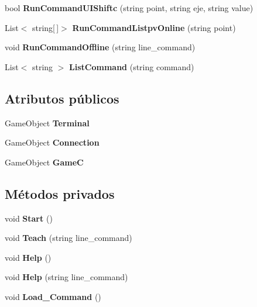\begin{DoxyCompactItemize}
bool {\bfseries Run\+Command\+U\+I\+Shiftc} (string point, string eje, string value)
\item 
\mbox{\label{class_controller_a65282850ef11298e5acd69b9ac61cdca}} 
List$<$ string\mbox{[}$\,$\mbox{]}$>$ {\bfseries Run\+Command\+Listpv\+Online} (string point)
\item 
\mbox{\label{class_controller_aa579bf7f25f6004e8e0e25a2dd044315}} 
void {\bfseries Run\+Command\+Offline} (string line\+\_\+command)
\item 
\mbox{\label{class_controller_ab898360be80b484fa530ed9551b37897}} 
List$<$ string $>$ {\bfseries List\+Command} (string command)
\end{DoxyCompactItemize}
\subsection*{Atributos públicos}
\begin{DoxyCompactItemize}
\item 
\mbox{\label{class_controller_a51323d3c4ec14f6cb08c5ff78f043294}} 
Game\+Object {\bfseries Terminal}
\item 
\mbox{\label{class_controller_af40ddeff071064e6f098552df3cfd34e}} 
Game\+Object {\bfseries Connection}
\item 
\mbox{\label{class_controller_a1eb5e590212ea6268156999f313bf76c}} 
Game\+Object {\bfseries GameC}
\end{DoxyCompactItemize}
\subsection*{Métodos privados}
\begin{DoxyCompactItemize}
\item 
\mbox{\label{class_controller_afb3af298c368aea3203c2c0401f92eb5}} 
void {\bfseries Start} ()
\item 
\mbox{\label{class_controller_a5451887045a5b5daedd6fb1d0c9c90ae}} 
void {\bfseries Teach} (string line\+\_\+command)
\item 
\mbox{\label{class_controller_aec3ce5bf2c2fa1e9a3aba0b9c2475770}} 
void {\bfseries Help} ()
\item 
\mbox{\label{class_controller_ab6a32e48c4abe328f741916fbeccb0c5}} 
void {\bfseries Help} (string line\+\_\+command)
\item 
\mbox{\label{class_controller_abafc0ba1c023556d28a3034dca656d21}} 
void {\bfseries Load\+\_\+\+Command} ()
\end{DoxyCompactItemize}
